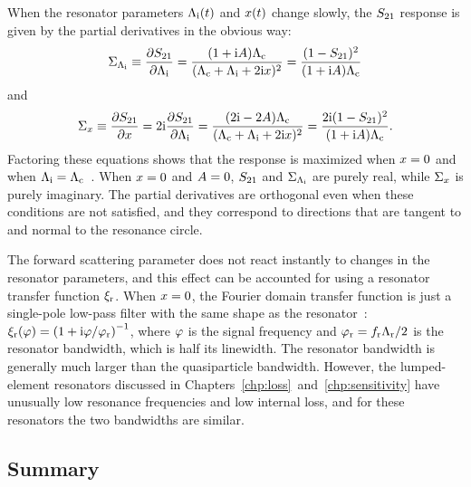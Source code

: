 When the resonator parameters $\Lambda_{\mathrm{i}}(t)$ and $x(t)$ change slowly, the $S_{21}$ response is given by the partial derivatives in the obvious way:
\begin{equation}
\Sigma_{\Lambda_{\mathrm{i}}}
  \equiv
  \pdv{S_{21}}{\Lambda_{\mathrm{i}}}
  =
  \frac{(1 + \mathrm{i} A) \Lambda_{\mathrm{c}}}{(\Lambda_{\mathrm{c}} + \Lambda_{\mathrm{i}} + 2 \mathrm{i} x)^2}
  =
  \frac{(1 - S_{21})^2}{(1 + \mathrm{i} A) \Lambda_{\mathrm{c}}}
\end{equation}
and
\begin{equation}
\Sigma_x
  \equiv
  \pdv{S_{21}}{x} 
  =
  2 \mathrm{i} \pdv{S_{21}}{\Lambda_{\mathrm{i}}}
  =
    \frac{(2 \mathrm{i} - 2 A) \Lambda_{\mathrm{c}}}{(\Lambda_{\mathrm{c}} + \Lambda_{\mathrm{i}} + 2 \mathrm{i} x)^2}
  =
  \frac{2 \mathrm{i} (1 - S_{21})^2}{(1 + \mathrm{i} A) \Lambda_{\mathrm{c}}}.
\end{equation}
Factoring these equations shows that the response is maximized when $x = 0$ and when $\Lambda_{\mathrm{i}} = \Lambda_{\mathrm{c}}$~\autocite{Zmuidzinas2012ARCMP}.
When $x = 0$ and $A = 0$, $S_{21}$  and $\Sigma_{\Lambda_{\mathrm{i}}}$ are purely real, while $\Sigma_x$ is purely imaginary.
The partial derivatives are orthogonal even when these conditions are not satisfied, and they correspond to directions that are tangent to and normal to the resonance circle.

The forward scattering parameter does not react instantly to changes in the resonator parameters, and this effect can be accounted for using a resonator transfer function $\xi_{\mathrm{r}}$.
When $x = 0$, the Fourier domain transfer function is just a single-pole low-pass filter with the same shape as the resonator~\autocite{Gao2008,Zmuidzinas2012ARCMP}:
$\xi_{\mathrm{r}}(\varphi)
  =
  \left( 1 + \mathrm{i} \varphi / \varphi_{\mathrm{r}} \right)^{-1}$,
where $\varphi$ is the signal frequency and
$\varphi_{\mathrm{r}} = f_{\mathrm{r}} \Lambda_{\mathrm{r}} / 2$
is the resonator bandwidth, which is half its linewidth.
The resonator bandwidth is generally much larger than the quasiparticle bandwidth.
However, the lumped-element resonators discussed in Chapters~\ref{chp:loss}~and~\ref{chp:sensitivity} have unusually low resonance frequencies and low internal loss, and for these resonators the two bandwidths are similar.


\subsection{Summary}
\label{sec:theory.response.summary}

